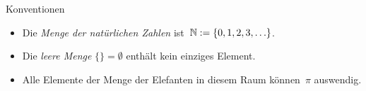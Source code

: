 \documentclass{zirkelblatt}
\begin{document}

\begin{block}{Konventionen}
\begin{itemize}
\item[]
Die \emph{Menge der natürlichen Zahlen} ist~$\mathbb{N} := \{ 0, 1, 2, 3, \ldots \}$.
\item[]
Die \emph{leere Menge} $\{ \} = \emptyset$ enthält kein einziges Element.
\item[]
Alle Elemente der Menge der Elefanten in diesem Raum können~$\pi$ auswendig.
\end{itemize}
\end{block}
\end{document}
